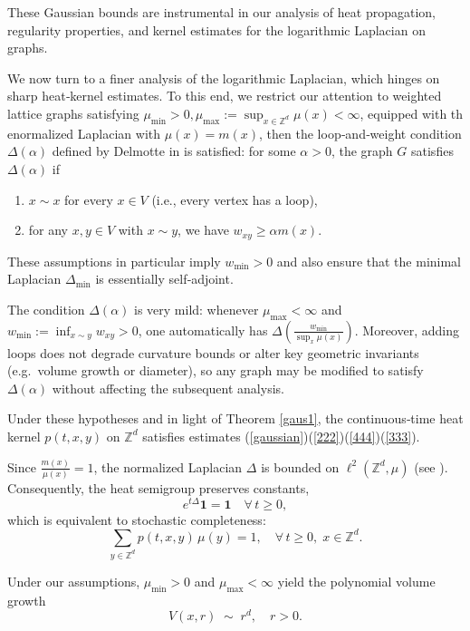 \documentclass[reqno,12pt]{amsart}
\numberwithin{equation}{section}
\begin{document}
	These Gaussian bounds are instrumental in our analysis of heat propagation, regularity properties, and kernel estimates for the logarithmic Laplacian on graphs.  
	
	We now turn to a finer analysis of the logarithmic Laplacian, which hinges on sharp heat‐kernel estimates.  To this end, we restrict our attention to weighted lattice graphs satisfying
	$\mu_{\min}>0, \mu_{\max}:=\sup_{x\in \mathbb{Z}^d}\mu(x)<\infty$, equipped with th enormalized Laplacian with $\mu(x)=m(x)$, then the loop‐and‐weight condition $\Delta(\alpha)$ defined by Delmotte in \cite{delmotte1999parabolic} is satisfied: for some $\alpha > 0$, the graph $G$ satisfies $\Delta(\alpha)$ if
\begin{enumerate}
	\item $x \sim x$ for every $x \in V$ (i.e., every vertex has a loop), 
	\item for any $x, y \in V$ with $x \sim y$, we have $w_{xy} \geq \alpha m(x)$.
\end{enumerate}
	
These assumptions in particular imply $w_{\min}>0$ and also ensure that the minimal Laplacian $\Delta_{\mathrm{min}}$ is essentially self‐adjoint.


	The condition $\Delta(\alpha)$  is very mild: whenever $\mu_{\max}<\infty$ and $w_{\min}:=\inf_{x \sim y}w_{xy}>0$, one automatically has
	$\Delta(\tfrac{w_{\min}}{\sup_x\mu(x)})$.  Moreover, adding loops does not degrade curvature bounds or alter key geometric invariants (e.g.\ volume growth or diameter), so any graph may be modified to satisfy $\Delta(\alpha)$ without affecting the subsequent analysis.
	


Under these hypotheses and in light of Theorem \ref{gaus1}, the continuous‐time heat kernel \(p(t,x,y)\) on \(\mathbb{Z}^d\) satisfies estimates (\ref{gaussian})(\ref{222})(\ref{444})(\ref{333}).

Since \(\frac{m(x)}{\mu(x)}=1\), the normalized Laplacian \(\Delta\) is bounded on \(\ell^2(\mathbb{Z}^d,\mu)\) (see \cite[Theorem~1.27]{keller2021graphs}). Consequently, the heat semigroup preserves constants,
\[
e^{t\Delta}\mathbf{1} = \mathbf{1}
\quad\forall\,t\ge0,
\]
which is equivalent to stochastic completeness:
\[
\sum_{y\in\mathbb{Z}^d}p(t,x,y)\,\mu(y)=1,
\quad\forall\,t\ge0,\;x\in\mathbb{Z}^d.
\]

Under our assumptions, \(\mu_{\min}>0\) and
$\mu_{\max}<\infty$ yield the polynomial volume growth
\[
V(x,r)\;\sim\;r^d,
\quad r>0.
\]
\end{document}
